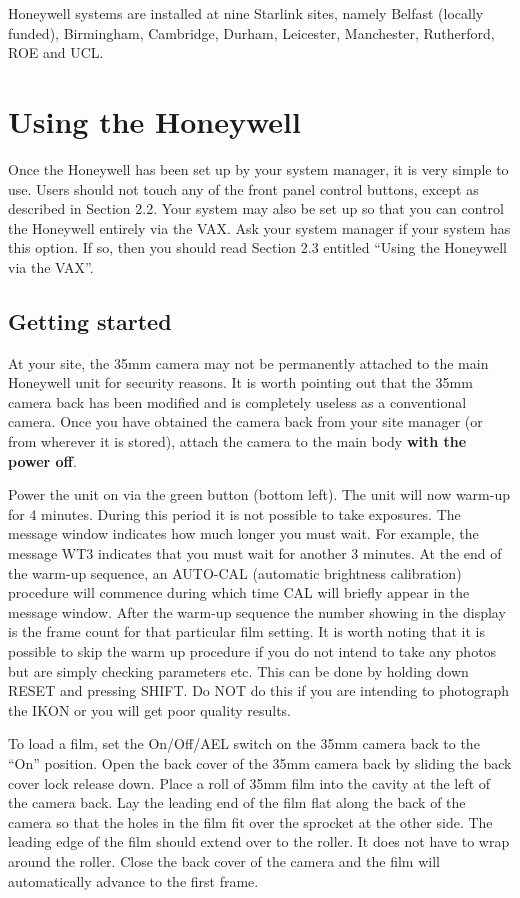 Honeywell systems are installed at nine Starlink sites, namely Belfast
(locally funded), Birmingham, Cambridge, Durham, Leicester, Manchester,
Rutherford, ROE and UCL.

\section{Using the Honeywell}

Once the Honeywell has been set up by your system manager, it is very simple
to use. Users should not touch any of the front panel control buttons, except 
as described in Section 2.2. Your system may also be set up so that
you can control the Honeywell entirely via the VAX. Ask your
system manager if your system has this option. If so, then you
should read Section 2.3 entitled ``Using the Honeywell via the VAX''.

\subsection{Getting started}

At your site, the 35mm camera may not be permanently attached to the main 
Honeywell unit
for security reasons. It is worth pointing out that the 35mm camera back has
been modified and is completely useless as a conventional camera. Once
you have obtained the camera back from your site manager (or from wherever it
is stored), attach the camera to the main body {\bf with the power off}.

Power the unit on via the green button (bottom left). The unit will now
warm-up for 4 minutes. During this period it is not possible to take
exposures. The message window indicates how much longer you must wait. For example,
the message WT3 indicates that you must wait for another 
3 minutes. At the end of the warm-up sequence, an AUTO-CAL (automatic
brightness calibration) procedure will commence during which time CAL will
briefly
appear in the message window. 
After the warm-up sequence the number showing in the display is the frame count
for that particular film setting. 
It is worth noting that it is possible to skip
the warm up procedure if you do not intend to take any photos but are simply
checking parameters etc. This can be done by holding down RESET and pressing
SHIFT. Do NOT do this if you are intending to photograph the IKON or you
will get poor quality results.

To load a film, set the On/Off/AEL switch on the 35mm
camera back to the ``On'' position. Open the back cover of the 35mm camera back
by sliding the back cover lock release down. Place a roll of 35mm film into the
cavity at the left of the camera back. Lay the leading end of the film flat
along the back of the camera so that the holes in the film fit over the
sprocket at the other side. The leading edge of the film should extend over to
the roller. It does not have to wrap around the roller. Close the back 
cover of the camera and the film will automatically advance to the first frame.

